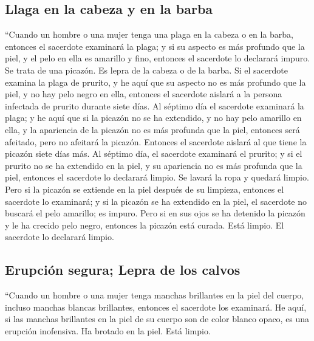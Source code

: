 \begin{paracol}{2}
\hypertarget{llaga-en-la-cabeza-y-en-la-barba}{%
\subsection{Llaga en la cabeza y en la
barba}\label{llaga-en-la-cabeza-y-en-la-barba}}

 ``Cuando un hombre o una mujer tenga una plaga en la
cabeza o en la barba,  entonces el sacerdote examinará la
plaga; y si su aspecto es más profundo que la piel, y el pelo en ella es
amarillo y fino, entonces el sacerdote lo declarará impuro. Se trata de
una picazón. Es lepra de la cabeza o de la barba.  Si el
sacerdote examina la plaga de prurito, y he aquí que su aspecto no es
más profundo que la piel, y no hay pelo negro en ella, entonces el
sacerdote aislará a la persona infectada de prurito durante siete días.
 Al séptimo día el sacerdote examinará la plaga; y he
aquí que si la picazón no se ha extendido, y no hay pelo amarillo en
ella, y la apariencia de la picazón no es más profunda que la piel,
 entonces será afeitado, pero no afeitará la picazón.
Entonces el sacerdote aislará al que tiene la picazón siete días más.
 Al séptimo día, el sacerdote examinará el prurito; y si
el prurito no se ha extendido en la piel, y su apariencia no es más
profunda que la piel, entonces el sacerdote lo declarará limpio. Se
lavará la ropa y quedará limpio.  Pero si la picazón se
extiende en la piel después de su limpieza,  entonces el
sacerdote lo examinará; y si la picazón se ha extendido en la piel, el
sacerdote no buscará el pelo amarillo; es impuro.  Pero
si en sus ojos se ha detenido la picazón y le ha crecido pelo negro,
entonces la picazón está curada. Está limpio. El sacerdote lo declarará
limpio.

\hypertarget{erupciuxf3n-segura-lepra-de-los-calvos}{%
\subsection{Erupción segura; Lepra de los
calvos}\label{erupciuxf3n-segura-lepra-de-los-calvos}}

 ``Cuando un hombre o una mujer tenga manchas brillantes
en la piel del cuerpo, incluso manchas blancas brillantes,
 entonces el sacerdote los examinará. He aquí, si las
manchas brillantes en la piel de su cuerpo son de color blanco opaco, es
una erupción inofensiva. Ha brotado en la piel. Está limpio.


\end{paracol}
